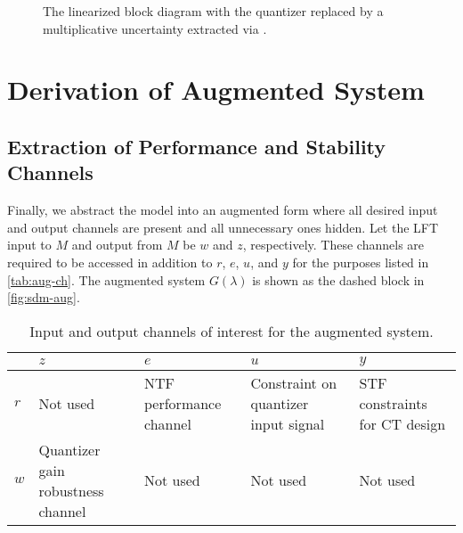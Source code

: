 \begin{figure}[h]
\begin{tikzpicture}[ampersand replacement=\&,scale=0.75, every node/.style={scale=0.75}]
	\end{tikzpicture}
	\caption{The linearized block diagram with the quantizer replaced by a multiplicative uncertainty extracted via .} \label{fig:sdm-stdf-lft}
\end{figure}

\section{Derivation of Augmented System}

\subsection{Extraction of Performance and Stability Channels}

Finally, we abstract the model into an augmented form where all desired input and output channels are present and all unnecessary ones hidden. Let the \gls{LFT} input to $M$ and output from $M$ be $w$ and $z$, respectively. These channels are required to be accessed in addition to $r$, $e$, $u$, and $y$ for the purposes listed in \autoref{tab:aug-ch}. The augmented system $G(\lambda)$ is shown as the dashed block in \autoref{fig:sdm-aug}.

\begin{table}[t]
	\begin{tabular}{l | >{\RaggedRight}p{2cm} >{\RaggedRight}p{2.25cm} >{\RaggedRight}p{2.25cm} >{\RaggedRight}p{2cm}}
		\toprule
		\diagbox[width=2cm, height=1cm]{\textbf{Input}}{\textbf{Output}} & $z$ & $e$ & $u$ & $y$ \\
		\midrule
		$r$ & Not used & \gls{NTF} performance channel & Constraint on quantizer input signal & \gls{STF} constraints for \gls{CT} design \\
		$w$ & Quantizer gain robustness channel & Not used & Not used & Not used \\
		\bottomrule
	\end{tabular}
	\caption{Input and output channels of interest for the augmented system.} \label{tab:aug-ch}
\end{table}

